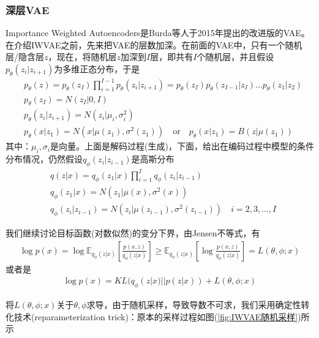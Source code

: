         \subsubsection{深层VAE}
            \par
            Importance Weighted Autoencoders是Burda等人于2015年提出的改进版的VAE。在介绍IWVAE之前，先来把VAE的层数加深。在前面的VAE中，只有一个随机层/隐含层$z$，现在，将随机层$z$加深到$I$层，即共有$I$个随机层，并且假设$p_\theta(z_i|z_{i+1})$为多维正态分布，于是
            \begin{align*}
            & p_\theta(z) = p_\theta(z_I) \prod_{i=1}^{I-1}p_\theta(z_i|z_{i+1}) = p_\theta(z_I) p_\theta(z_{I-1}|z_I) \dots p_\theta(z_1|z_2)\\
            & p_\theta(z_I) = N(z_I|0,I)\\
            & p_\theta(z_i|z_{i+1}) = N(z_i|\mu_i,\sigma_i^2)\\
            & p_\theta(x|z_1) = N(x|\mu(z_1),\sigma^2(z_1)) \quad \mathrm{or} \quad p_\theta(x|z_1) = B(z|\mu(z_1))
            \end{align*}
            其中：$\mu_i,\sigma_i$是向量。上面是解码过程(生成)，下面，给出在编码过程中模型的条件分布情况，仍然假设$q_\phi(z_i|z_{i-1})$是高斯分布
            \begin{align*}
            & q(z|x) = q_\phi(z_1|x) \prod_{i=1}^Iq_\phi(z_i|z_{i-1})\\
            & q_\phi(z_1|x) = N(z_1|\mu(x),\sigma^2(x))\\
            & q_\phi(z_i|z_{i-1}) =N(z_i|\mu(z_{i-1}),\sigma^2(z_{i-1}))\quad i=2,3,\dots,I
            \end{align*}
            \par
            我们继续讨论目标函数(对数似然)的变分下界，由Jensen不等式，有
            \begin{align*}
            \log p(x) = \log \mathbb{E}_{q_\phi(z|x)} \left[ \frac{p(x,z)}{q_\phi(z|x)}  \right] \geqslant \mathbb{E}_{q_\phi(z|x)}\left[ \log \frac{p(x,z)}{q_\phi(z|x)} \right] = L(\theta,\phi;x)
            \end{align*}
            或者是
            \begin{align*}
            \log p(x) = KL(q_\phi(z|x)||p(z|x)) + L(\theta,\phi;x)
            \end{align*}
            \par
            将$L(\theta,\phi;x)$关于$\theta,\phi$求导，由于随机采样，导致导数不可求，我们采用确定性转化技术(reparameterization trick)：原本的采样过程如图(\ref{fig:IWVAE随机采样})所示
